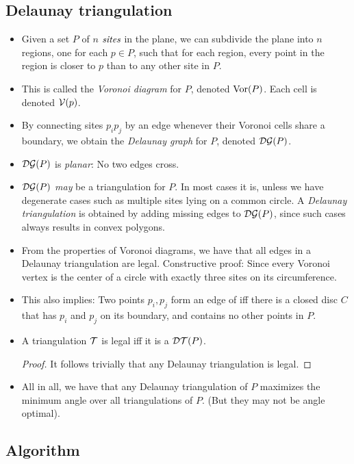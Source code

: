 \subsection{Delaunay triangulation}
\begin{itemize}
\item Given a set $P$ of $n$ $\emph{sites}$ in the plane, we can
  subdivide the plane into $n$ regions, one for each $p \in P$, such
  that for each region, every point in the region is closer to $p$
  than to any other site in $P$.
\item This is called the \emph{Voronoi diagram} for $P$, denoted
  $\mathrm{Vor}(P)$. Each cell is denoted $\mathcal{V}(p)$.
\item By connecting sites $p_ip_j$ by an edge whenever their Voronoi
  cells share a boundary, we obtain the \emph{Delaunay graph} for $P$,
  denoted $\mathcal{DG}(P)$.
\item $\mathcal{DG}(P)$ is \emph{planar}: No two edges cross.
\item $\mathcal{DG}(P)$ \emph{may} be a triangulation for $P$. In most cases it
  is, unless we have degenerate cases such as multiple sites lying on
  a common circle. A \emph{Delaunay triangulation} is obtained by
  adding missing edges to $\mathcal{DG}(P)$, since such cases always results in
  convex polygons.
\item From the properties of Voronoi diagrams, we have that all edges
  in a Delaunay triangulation are legal. Constructive proof: Since
  every Voronoi vertex is the center of a circle with exactly three
  sites on its circumference.
\item This also implies: Two points $p_i, p_j$ form an edge of iff
  there is a closed disc $C$ that has $p_i$ and $p_j$ on its boundary,
  and contains no other points in $P$.
\item A triangulation $\mathcal{T}$ is legal iff it is a $\mathcal{DT}(P)$.
\begin{proof}
  It follows trivially that any Delaunay triangulation is legal.
\end{proof}

\item All in all, we have that any Delaunay triangulation of $P$
  maximizes the minimum angle over all triangulations of $P$. (But
  they may not be angle optimal).
\end{itemize}

\subsection{Algorithm}

